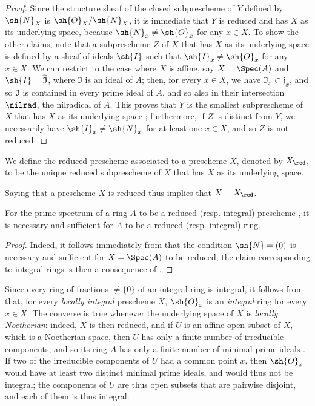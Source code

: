 \begin{proof}
Since the structure sheaf of the closed subprescheme of $Y$ defined by $\sh{N}_X$ is $\sh{O}_X/\sh{N}_X$, it is immediate that $Y$ is reduced and has $X$ as its underlying space, because $\sh{N}_x\neq\sh{O}_x$ for any $x\in X$.
To show the other claims, note that a subprescheme $Z$ of $X$ that has $X$ as its underlying space is defined by a sheaf of ideals $\sh{I}$  such that $\sh{I}_x\neq\sh{O}_x$ for any $x\in X$.
We can restrict to the case where $X$ is affine, say $X=\Spec(A)$ and $\sh{I}=\widetilde{\mathfrak{I}}$, where $\mathfrak{I}$ is an ideal of $A$;
then, for every $x\in X$, we have $\mathfrak{I}_x\subset\mathfrak{j}_x$, and so $\mathfrak{I}$ is contained in every prime ideal of $A$, and so also in their intersection $\nilrad$, the nilradical of $A$.
This proves that $Y$ is the smallest subprescheme of $X$ that has $X$ as its underlying space ;
furthermore, if $Z$ is distinct from $Y$, we necessarily have $\sh{I}_x\neq\sh{N}_x$ for at least one $x\in X$, and so  $Z$ is not reduced.
\end{proof}

\begin{definition}[5.1.3]
\label{I.5.1.3}
We define the reduced prescheme associated to a prescheme $X$, denoted by $X_\red$, to be the unique reduced subprescheme of $X$ that has $X$ as its underlying space.
\end{definition}

Saying that a prescheme $X$ is reduced thus implies that $X=X_\red$.

\begin{proposition}[5.1.4]
\label{I.5.1.4}
For the prime spectrum of a ring $A$ to be a reduced (resp. integral) prescheme , it is necessary and sufficient for $A$ to be a reduced (resp. integral) ring.
\end{proposition}

\begin{proof}
Indeed, it follows immediately from  that the condition $\sh{N}=(0)$ is necessary and sufficient for $X=\Spec(A)$ to be reduced;
the claim corresponding to integral rings is then a consequence of .
\end{proof}

Since every ring of fractions $\neq\{0\}$ of an integral ring is integral, it follows from  that, for every \emph{locally integral} prescheme $X$, $\sh{O}_x$ is an \emph{integral} ring for every $x\in X$.
The converse is true whenever the underlying space of $X$ is \emph{locally Noetherian}:
indeed, $X$ is then reduced, and if $U$ is an affine open subset of $X$, which is a Noetherian space, then $U$ has only a finite number of irreducible components, and so its ring $A$ has only a finite number of minimal prime ideals .
If two of the irreducible components of $U$ had a common point $x$, then $\sh{O}_x$ would have at least two distinct minimal prime ideals, and would thus not be integral;
the components of $U$ are thus open subsets that are pairwise disjoint, and each of them is thus integral.

